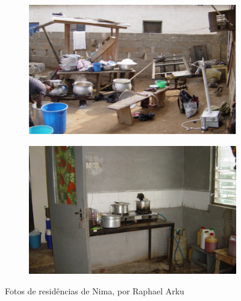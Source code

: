 



\begin{figure}[H]
  \begin{subfigure}[b]{0.5\textwidth}
    \includegraphics[width=\textwidth]{../inputs/images/zheng/nima1.jpg}
    \caption{}
  \end{subfigure}%
  \begin{subfigure}[b]{0.5\textwidth}
    \includegraphics[width=\textwidth]{../inputs/images/zheng/nima2.jpg}
    \caption{}
  \end{subfigure}
  \caption{Fotos de residências de Nima, por Raphael Arku \label{fig:nima}}
\end{figure}
